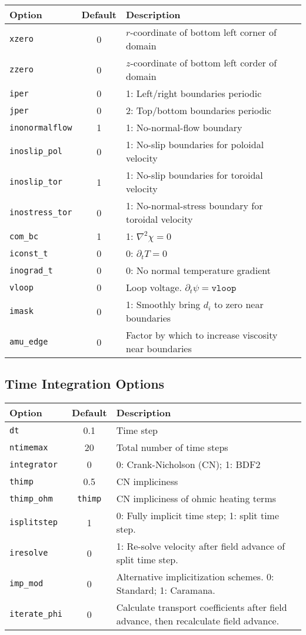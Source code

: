 \documentclass[letterpaper]{book}
\begin{document}
\begin{tabular}{lcp{2.5in}}
  \textbf{Option} & \textbf{Default} & \textbf{Description}\\
  \hline
  \texttt{xzero}  & 0 & $r$-coordinate of bottom left corner of domain\\
  \texttt{zzero}  & 0 & $z$-coordinate of bottom left corder of domain\\
  \texttt{iper}   & 0 & 1: Left/right boundaries periodic\\
  \texttt{jper}   & 0 & 2: Top/bottom boundaries periodic\\
  \texttt{inonormalflow}& 1 & 1: No-normal-flow boundary\\
  \texttt{inoslip\_pol} & 0 & 1: No-slip boundaries for poloidal velocity\\
  \texttt{inoslip\_tor} & 1 & 1: No-slip boundaries for toroidal velocity\\
  \texttt{inostress\_tor}&0 & 1: No-normal-stress boundary for toroidal 
                                 velocity\\
  \texttt{com\_bc}& 1 & 1: $\nabla^2 \chi = 0$\\
  \texttt{iconst\_t}  & 0 & 0: $\partial_t T = 0$\\
  \texttt{inograd\_t} & 0 & 0: No normal temperature gradient\\
  \texttt{vloop}  & 0 & Loop voltage.  $\partial_t \psi = \mathtt{vloop}$\\
  \texttt{imask}  & 0 & 1: Smoothly bring $d_i$ to zero near
    boundaries\\
  \texttt{amu\_edge} & 0 &    Factor by which to increase viscosity near 
                              boundaries
\end{tabular}


\subsection{Time Integration Options}
\begin{tabular}{lcp{3in}}
  \textbf{Option}&\textbf{Default}&\textbf{Description}\\
  \hline
  \texttt{dt}         & 0.1 & Time step\\
  \texttt{ntimemax}   & 20  & Total number of time steps\\
  \texttt{integrator} & 0   & 0: Crank-Nicholson (CN); 1: BDF2\\
  \texttt{thimp}      & 0.5 & CN impliciness\\
  \texttt{thimp\_ohm} & \texttt{thimp} & 
                              CN impliciness of ohmic heating terms\\
  \texttt{isplitstep} & 1   & 0: Fully implicit time step; 
                              1: split time step.\\
  \texttt{iresolve}   & 0   & 1: Re-solve velocity after 
                              field advance of split time step.\\
  \texttt{imp\_mod}   & 0   & Alternative implicitization
    schemes. 0: Standard; 1: Caramana.\\
  \texttt{iterate\_phi} & 0 & Calculate transport coefficients after
    field advance, then recalculate field advance.
\end{tabular}
\end{document}
